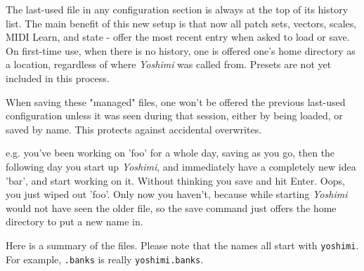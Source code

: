    The last-used file in any configuration section is always at the top of its
   history list.  The main benefit of this new setup is that now all patch
   sets, vectors, scales, MIDI Learn, and state - offer the most recent entry
   when asked to load or save. On first-time use, when there is no history, one
   is offered one's home directory as a location, regardless of where
   \textsl{Yoshimi} was called from.  Presets are not yet included in this
   process.

   When saving these "managed" files, one won't be offered the previous
   last-used configuration unless it was seen during that session, either by
   being loaded, or saved by name.  This protects against accidental
   overwrites.

   e.g. you've been working on 'foo' for a whole day, saving as you go,
   then the following day you start up \textsl{Yoshimi}, and immediately have
   a completely new idea 'bar', and start working on it. Without thinking you
   save and hit Enter. Oops, you just wiped out 'foo'. Only now you haven't,
   because while starting \textsl{Yoshimi} would not have seen the older file,
   so the save command just offers the home directory to put a new name in.

   Here is a summary of the files.  Please note that the names all start with
   \texttt{yoshimi}.  For example, \texttt{.banks} is really
   \texttt{yoshimi.banks}.

